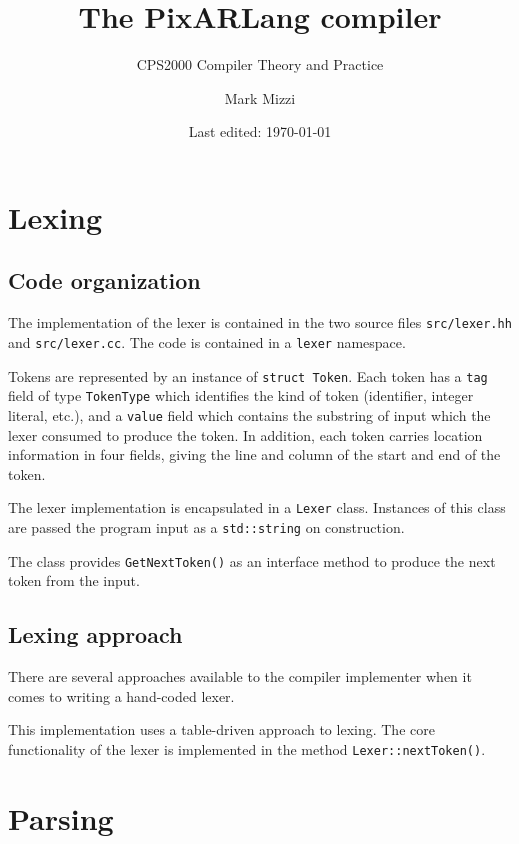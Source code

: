 \documentclass[11pt,a4paper]{scrartcl}
\title{The PixARLang compiler}
\subtitle{CPS2000 Compiler Theory and Practice}
\author{Mark Mizzi}
\date{Last edited: \today}
\begin{document}
\maketitle

\tableofcontents

\newpage

\section{Lexing}

\subsection{Code organization}

The implementation of the lexer is contained in the two source files \verb!src/lexer.hh! and \verb!src/lexer.cc!. The code is contained in a \verb!lexer! namespace.

Tokens are represented by an instance of \verb!struct Token!. Each token has a \verb!tag! field of type \verb!TokenType! which identifies the kind of token (identifier, integer literal, etc.), and a \verb!value! field which contains the substring of input which the lexer consumed to produce the token. In addition, each token carries location information in four fields, giving the line and column of the start and end of the token.

The lexer implementation is encapsulated in a \verb!Lexer! class. Instances of this class are passed the program input as a \verb!std::string! on construction.

The class provides \verb!GetNextToken()! as an interface method to produce the next token from the input.

\subsection{Lexing approach}

There are several approaches available to the compiler implementer when it comes to writing a hand-coded lexer.

This implementation uses a table-driven approach to lexing. The core functionality of the lexer is implemented in the method \verb!Lexer::nextToken()!.

\newpage

\section{Parsing}
\end{document}
